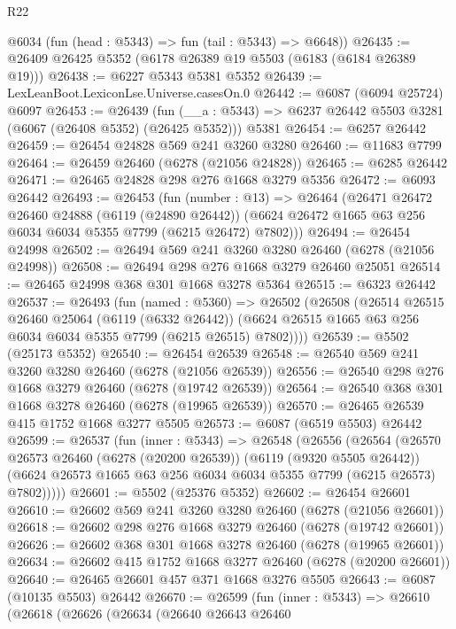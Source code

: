 \begin{lexlean}{R22}
\begin{coremodule}
      @6034
      (fun (head : @5343) => fun (tail : @5343) => @6648))
@26435 := @26409 @26425 @5352 (@6178 @26389 @19 @5503 (@6183 (@6184 @26389 @19)))
@26438 := @6227 @5343 @5381 @5352
@26439 := LexLeanBoot.LexiconLse.Universe.casesOn.{0}
@26442 := @6087 (@6094 @25724) @6097
@26453 := @26439
    (fun (__a : @5343) => @6237 @26442 @5503 @3281 (@6067 (@26408 @5352) (@26425 @5352)))
    @5381
@26454 := @6257 @26442
@26459 := @26454 @24828 @569 @241 @3260 @3280
@26460 := @11683 @7799
@26464 := @26459 @26460 (@6278 (@21056 @24828))
@26465 := @6285 @26442
@26471 := @26465 @24828 @298 @276 @1668 @3279 @5356
@26472 := @6093 @26442
@26493 := @26453
    (fun (number : @13) =>
    @26464
      (@26471
        @26472
        @26460
        @24888
        (@6119 (@24890 @26442))
        (@6624 @26472 @1665 @63 @256 @6034 @6034 @5355 @7799 (@6215 @26472) @7802)))
@26494 := @26454 @24998
@26502 := @26494 @569 @241 @3260 @3280 @26460 (@6278 (@21056 @24998))
@26508 := @26494 @298 @276 @1668 @3279 @26460 @25051
@26514 := @26465 @24998 @368 @301 @1668 @3278 @5364
@26515 := @6323 @26442
@26537 := @26493
    (fun (named : @5360) =>
    @26502
      (@26508
        (@26514
          @26515
          @26460
          @25064
          (@6119 (@6332 @26442))
          (@6624 @26515 @1665 @63 @256 @6034 @6034 @5355 @7799 (@6215 @26515) @7802))))
@26539 := @5502 (@25173 @5352)
@26540 := @26454 @26539
@26548 := @26540 @569 @241 @3260 @3280 @26460 (@6278 (@21056 @26539))
@26556 := @26540 @298 @276 @1668 @3279 @26460 (@6278 (@19742 @26539))
@26564 := @26540 @368 @301 @1668 @3278 @26460 (@6278 (@19965 @26539))
@26570 := @26465 @26539 @415 @1752 @1668 @3277 @5505
@26573 := @6087 (@6519 @5503) @26442
@26599 := @26537
    (fun (inner : @5343) =>
    @26548
      (@26556
        (@26564
          (@26570
            @26573
            @26460
            (@6278 (@20200 @26539))
            (@6119 (@9320 @5505 @26442))
            (@6624 @26573 @1665 @63 @256 @6034 @6034 @5355 @7799 (@6215 @26573) @7802)))))
@26601 := @5502 (@25376 @5352)
@26602 := @26454 @26601
@26610 := @26602 @569 @241 @3260 @3280 @26460 (@6278 (@21056 @26601))
@26618 := @26602 @298 @276 @1668 @3279 @26460 (@6278 (@19742 @26601))
@26626 := @26602 @368 @301 @1668 @3278 @26460 (@6278 (@19965 @26601))
@26634 := @26602 @415 @1752 @1668 @3277 @26460 (@6278 (@20200 @26601))
@26640 := @26465 @26601 @457 @371 @1668 @3276 @5505
@26643 := @6087 (@10135 @5503) @26442
@26670 := @26599
    (fun (inner : @5343) =>
    @26610
      (@26618
        (@26626
          (@26634
            (@26640
              @26643
              @26460

\end{coremodule}
\end{lexlean}
